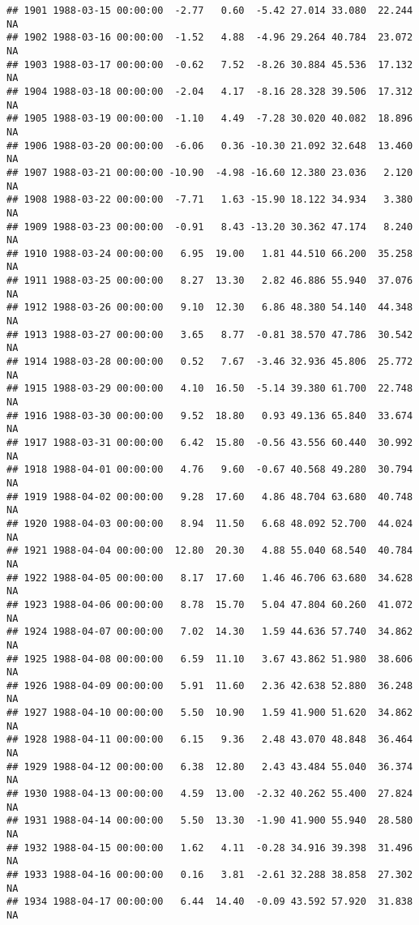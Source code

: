 \documentclass{article}\usepackage{graphicx, color}
\makeatletter
\newenvironment{kframe}{%
 \def\at@end@of@kframe{}%
 \ifinner\ifhmode%
  \def\at@end@of@kframe{\end{minipage}}%
  \begin{minipage}{\columnwidth}%
 \fi\fi%
 \def\FrameCommand##1{\hskip\@totalleftmargin \hskip-\fboxsep
 \colorbox{shadecolor}{##1}\hskip-\fboxsep
     \hskip-\linewidth \hskip-\@totalleftmargin \hskip\columnwidth}%
 \MakeFramed {\advance\hsize-\width
   \@totalleftmargin\z@ \linewidth\hsize
   \@setminipage}}%
 {\par\unskip\endMakeFramed%
 \at@end@of@kframe}
\newenvironment{knitrout}{}{} %
\makeatother
\begin{document}
\begin{knitrout}
\begin{kframe}
\begin{verbatim}
## 1901 1988-03-15 00:00:00  -2.77   0.60  -5.42 27.014 33.080  22.244     NA
## 1902 1988-03-16 00:00:00  -1.52   4.88  -4.96 29.264 40.784  23.072     NA
## 1903 1988-03-17 00:00:00  -0.62   7.52  -8.26 30.884 45.536  17.132     NA
## 1904 1988-03-18 00:00:00  -2.04   4.17  -8.16 28.328 39.506  17.312     NA
## 1905 1988-03-19 00:00:00  -1.10   4.49  -7.28 30.020 40.082  18.896     NA
## 1906 1988-03-20 00:00:00  -6.06   0.36 -10.30 21.092 32.648  13.460     NA
## 1907 1988-03-21 00:00:00 -10.90  -4.98 -16.60 12.380 23.036   2.120     NA
## 1908 1988-03-22 00:00:00  -7.71   1.63 -15.90 18.122 34.934   3.380     NA
## 1909 1988-03-23 00:00:00  -0.91   8.43 -13.20 30.362 47.174   8.240     NA
## 1910 1988-03-24 00:00:00   6.95  19.00   1.81 44.510 66.200  35.258     NA
## 1911 1988-03-25 00:00:00   8.27  13.30   2.82 46.886 55.940  37.076     NA
## 1912 1988-03-26 00:00:00   9.10  12.30   6.86 48.380 54.140  44.348     NA
## 1913 1988-03-27 00:00:00   3.65   8.77  -0.81 38.570 47.786  30.542     NA
## 1914 1988-03-28 00:00:00   0.52   7.67  -3.46 32.936 45.806  25.772     NA
## 1915 1988-03-29 00:00:00   4.10  16.50  -5.14 39.380 61.700  22.748     NA
## 1916 1988-03-30 00:00:00   9.52  18.80   0.93 49.136 65.840  33.674     NA
## 1917 1988-03-31 00:00:00   6.42  15.80  -0.56 43.556 60.440  30.992     NA
## 1918 1988-04-01 00:00:00   4.76   9.60  -0.67 40.568 49.280  30.794     NA
## 1919 1988-04-02 00:00:00   9.28  17.60   4.86 48.704 63.680  40.748     NA
## 1920 1988-04-03 00:00:00   8.94  11.50   6.68 48.092 52.700  44.024     NA
## 1921 1988-04-04 00:00:00  12.80  20.30   4.88 55.040 68.540  40.784     NA
## 1922 1988-04-05 00:00:00   8.17  17.60   1.46 46.706 63.680  34.628     NA
## 1923 1988-04-06 00:00:00   8.78  15.70   5.04 47.804 60.260  41.072     NA
## 1924 1988-04-07 00:00:00   7.02  14.30   1.59 44.636 57.740  34.862     NA
## 1925 1988-04-08 00:00:00   6.59  11.10   3.67 43.862 51.980  38.606     NA
## 1926 1988-04-09 00:00:00   5.91  11.60   2.36 42.638 52.880  36.248     NA
## 1927 1988-04-10 00:00:00   5.50  10.90   1.59 41.900 51.620  34.862     NA
## 1928 1988-04-11 00:00:00   6.15   9.36   2.48 43.070 48.848  36.464     NA
## 1929 1988-04-12 00:00:00   6.38  12.80   2.43 43.484 55.040  36.374     NA
## 1930 1988-04-13 00:00:00   4.59  13.00  -2.32 40.262 55.400  27.824     NA
## 1931 1988-04-14 00:00:00   5.50  13.30  -1.90 41.900 55.940  28.580     NA
## 1932 1988-04-15 00:00:00   1.62   4.11  -0.28 34.916 39.398  31.496     NA
## 1933 1988-04-16 00:00:00   0.16   3.81  -2.61 32.288 38.858  27.302     NA
## 1934 1988-04-17 00:00:00   6.44  14.40  -0.09 43.592 57.920  31.838     NA

\end{verbatim}
\end{kframe}
\end{knitrout}
\end{document}
